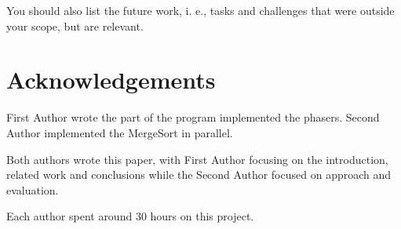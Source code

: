\documentclass[runningheads]{llncs}
\begin{document}
You should also list the future work, i. e., tasks and challenges that were outside your scope, but are relevant.

\section*{Acknowledgements}

First Author wrote the part of the program implemented the phasers. Second Author implemented the MergeSort in parallel. 

Both authors wrote this paper, with First Author focusing on the introduction, related work and conclusions while the Second Author focused on approach and evaluation.

Each author spent around 30 hours on this project.



\end{document}
